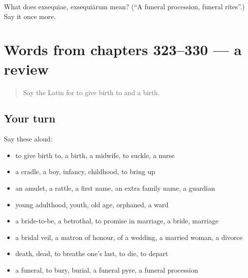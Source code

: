 \begin{tcolorbox}[breakable,colback=teal!4,colframe=teal!35!black,title={Before you move on}]
What does exsequiae, exsequiārum mean? (\textquotedblleft{}A funeral procession, funeral rites\textquotedblright{}.) Say it once more.
\end{tcolorbox}
\section[(dialogue)]{Words from chapters 323–330 — a review}

\label{lesson:LA-R330-review-323-330}



\begin{quote}
Say the Latin for to give birth to and a birth.
\end{quote}

\subsection*{Your turn}
Say these aloud:

\begin{itemize}
\raggedright
  \item to give birth to, a birth, a midwife, to suckle, a nurse
  \item a cradle, a boy, infancy, childhood, to bring up
  \item an amulet, a rattle, a first name, an extra family name, a guardian
  \item young adulthood, youth, old age, orphaned, a ward
  \item a bride-to-be, a betrothal, to promise in marriage, a bride, marriage
  \item a bridal veil, a matron of honour, of a wedding, a married woman, a divorce
  \item death, dead, to breathe one's last, to die, to depart
  \item a funeral, to bury, burial, a funeral pyre, a funeral procession
\end{itemize}

